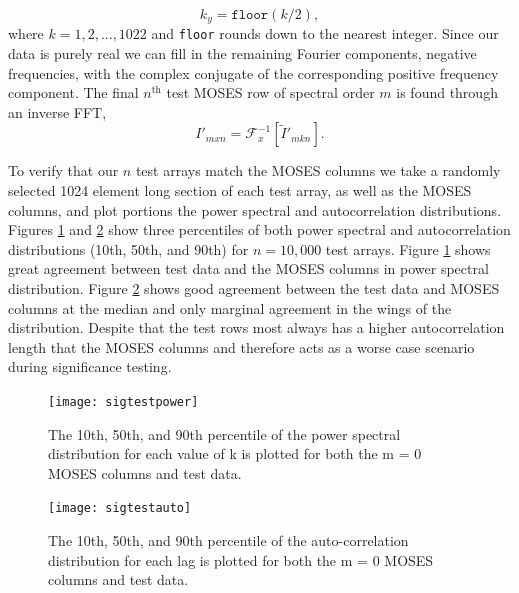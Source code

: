		\begin{equation}
			k_y = \texttt{floor}(k/2),
		\end{equation}
		where $k = 1, 2,...,1022$ and \texttt{floor} rounds down to the nearest integer.
		Since our data is purely real we can fill in the remaining Fourier components,  negative frequencies, with the complex conjugate of the corresponding positive frequency component.  
		The final $n^\text{th}$ test MOSES row of spectral order $m$ is found through an inverse FFT, 		
		\begin{equation}
			I'_{mxn} = \mathcal{F}_x^{-1}\left[\widetilde{I}'_{mkn}\right].
		\end{equation}
		
		To verify that our $n$ test arrays match the MOSES columns we take a randomly selected 1024 element long section of each test array, as well as the MOSES columns, and plot portions the power spectral and autocorrelation distributions. 
		Figures \ref{fig:sigtestpower} and \ref{fig:sigtestauto}  show three percentiles of both power spectral and autocorrelation distributions (10th, 50th, and 90th) for $n=10,000$ test arrays. 
		Figure \ref{fig:sigtestpower} shows great agreement between test data and the MOSES columns in power spectral distribution.  
		Figure \ref{fig:sigtestauto} shows good agreement between the test data and MOSES columns at the median and only marginal agreement in the wings of the distribution.  
		Despite that the test rows most always has a higher autocorrelation length that the MOSES columns and therefore acts as a worse case scenario during significance testing.  
					
		\begin{figure}
			\centering
			\texttt{[image: sigtestpower]}
			\caption{The 10th, 50th, and 90th percentile of the power spectral distribution for each value of k is plotted for both the m = 0 MOSES columns and test data.}
			\label{fig:sigtestpower}
		\end{figure}
		\begin{figure}
			\centering
			\texttt{[image: sigtestauto]}
			\caption{The 10th, 50th, and 90th percentile of the auto-correlation distribution for each lag is plotted for both the m = 0 MOSES columns and test data.}
			\label{fig:sigtestauto}
		\end{figure}
	
